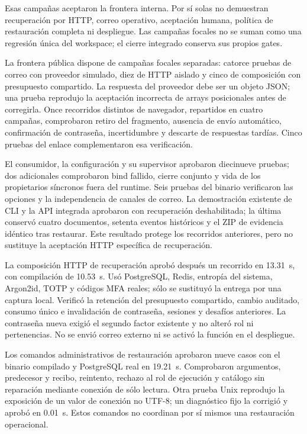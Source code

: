 Esas campañas aceptaron la frontera interna. Por sí solas no demuestran
recuperación por HTTP, correo operativo, aceptación humana, política de
restauración completa ni despliegue. Las campañas focales no se suman como una
regresión única del workspace; el cierre integrado conserva sus propios gates.


La frontera pública dispone de campañas focales separadas: catorce pruebas de
correo con proveedor simulado, diez de HTTP aislado y cinco de composición con
presupuesto compartido. La respuesta del proveedor debe ser un objeto JSON;
una prueba reprodujo la aceptación incorrecta de arrays posicionales antes de
corregirla. Once recorridos distintos de navegador, repartidos en cuatro
campañas, comprobaron retiro del fragmento, ausencia de envío automático,
confirmación de contraseña, incertidumbre y descarte de respuestas tardías.
Cinco pruebas del enlace complementaron esa verificación.

El consumidor, la configuración y su supervisor aprobaron diecinueve pruebas;
dos adicionales comprobaron bind fallido, cierre conjunto y vida de los
propietarios síncronos fuera del runtime. Seis pruebas del binario verificaron
las opciones y la independencia de canales de correo. La demostración existente
de CLI y la API integrada aprobaron con recuperación deshabilitada; la última
conservó cuatro documentos, setenta eventos históricos y el ZIP de evidencia
idéntico tras restaurar. Este resultado protege los recorridos anteriores, pero
no sustituye la aceptación HTTP específica de recuperación.

La composición HTTP de recuperación aprobó después un recorrido en 13.31~s,
con compilación de 10.53~s. Usó PostgreSQL, Redis, entropía del sistema, Argon2id,
TOTP y códigos MFA reales; sólo se sustituyó la entrega por una captura local.
Verificó la retención del presupuesto compartido, cambio auditado, consumo único
e invalidación de contraseña, sesiones y desafíos anteriores. La contraseña
nueva exigió el segundo factor existente y no alteró rol ni pertenencias.
No se envió correo externo ni se activó la función en el despliegue.

Los comandos administrativos de restauración aprobaron nueve casos con el
binario compilado y PostgreSQL real en 19.21~s. Comprobaron argumentos,
predecesor y recibo, reintento, rechazo al rol de ejecución y catálogo sin
reparación mediante conexión de sólo lectura. Otra prueba Unix reprodujo la
exposición de un valor de conexión no UTF-8; un diagnóstico fijo la corrigió y
aprobó en 0.01~s. Estos comandos no coordinan por sí mismos una restauración operacional.

